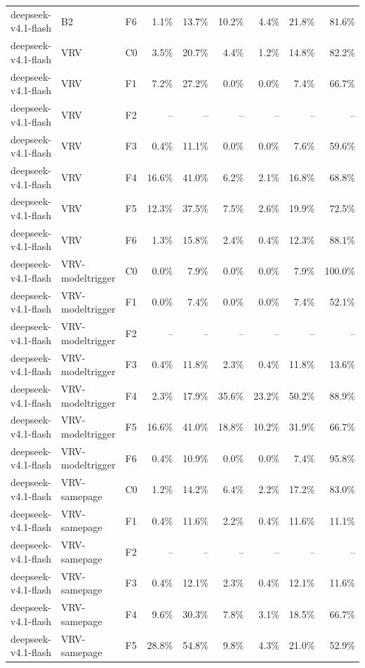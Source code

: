 \begin{tabular}{lllrrrrrr}
deepseek-v4.1-flash & B2 & F6 & 1.1\% & 13.7\% & 10.2\% & 4.4\% & 21.8\% & 81.6\% \\
deepseek-v4.1-flash & VRV & C0 & 3.5\% & 20.7\% & 4.4\% & 1.2\% & 14.8\% & 82.2\% \\
deepseek-v4.1-flash & VRV & F1 & 7.2\% & 27.2\% & 0.0\% & 0.0\% & 7.4\% & 66.7\% \\
deepseek-v4.1-flash & VRV & F2 & -- & -- & -- & -- & -- & -- \\
deepseek-v4.1-flash & VRV & F3 & 0.4\% & 11.1\% & 0.0\% & 0.0\% & 7.6\% & 59.6\% \\
deepseek-v4.1-flash & VRV & F4 & 16.6\% & 41.0\% & 6.2\% & 2.1\% & 16.8\% & 68.8\% \\
deepseek-v4.1-flash & VRV & F5 & 12.3\% & 37.5\% & 7.5\% & 2.6\% & 19.9\% & 72.5\% \\
deepseek-v4.1-flash & VRV & F6 & 1.3\% & 15.8\% & 2.4\% & 0.4\% & 12.3\% & 88.1\% \\
deepseek-v4.1-flash & VRV-modeltrigger & C0 & 0.0\% & 7.9\% & 0.0\% & 0.0\% & 7.9\% & 100.0\% \\
deepseek-v4.1-flash & VRV-modeltrigger & F1 & 0.0\% & 7.4\% & 0.0\% & 0.0\% & 7.4\% & 52.1\% \\
deepseek-v4.1-flash & VRV-modeltrigger & F2 & -- & -- & -- & -- & -- & -- \\
deepseek-v4.1-flash & VRV-modeltrigger & F3 & 0.4\% & 11.8\% & 2.3\% & 0.4\% & 11.8\% & 13.6\% \\
deepseek-v4.1-flash & VRV-modeltrigger & F4 & 2.3\% & 17.9\% & 35.6\% & 23.2\% & 50.2\% & 88.9\% \\
deepseek-v4.1-flash & VRV-modeltrigger & F5 & 16.6\% & 41.0\% & 18.8\% & 10.2\% & 31.9\% & 66.7\% \\
deepseek-v4.1-flash & VRV-modeltrigger & F6 & 0.4\% & 10.9\% & 0.0\% & 0.0\% & 7.4\% & 95.8\% \\
deepseek-v4.1-flash & VRV-samepage & C0 & 1.2\% & 14.2\% & 6.4\% & 2.2\% & 17.2\% & 83.0\% \\
deepseek-v4.1-flash & VRV-samepage & F1 & 0.4\% & 11.6\% & 2.2\% & 0.4\% & 11.6\% & 11.1\% \\
deepseek-v4.1-flash & VRV-samepage & F2 & -- & -- & -- & -- & -- & -- \\
deepseek-v4.1-flash & VRV-samepage & F3 & 0.4\% & 12.1\% & 2.3\% & 0.4\% & 12.1\% & 11.6\% \\
deepseek-v4.1-flash & VRV-samepage & F4 & 9.6\% & 30.3\% & 7.8\% & 3.1\% & 18.5\% & 66.7\% \\
deepseek-v4.1-flash & VRV-samepage & F5 & 28.8\% & 54.8\% & 9.8\% & 4.3\% & 21.0\% & 52.9\% \\

\end{tabular}
